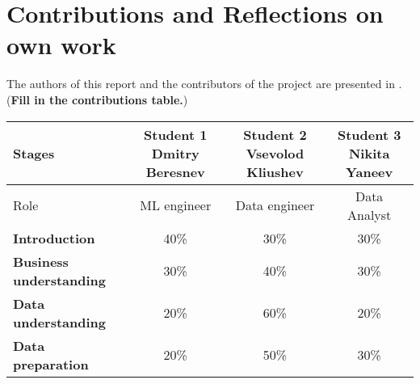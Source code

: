 \section{Contributions and Reflections on own work }\label{chap:contributionsAndReflectionOnOwnWork}

The authors of this report and the contributors of the project are presented in . (\textbf{Fill in the contributions table.})


\begin{table}[h!]
  \footnotesize
  \centering
  \begin{tabular}{|l||c|c|c|}
    \toprule
    Stages                          & \begin{minipage}{0.2\textwidth} Student 1 Dmitry Beresnev \end{minipage} & \begin{minipage}{0.2\textwidth} Student 2 Vsevolod Kliushev\end{minipage} & \begin{minipage}{0.2\textwidth} Student 3 Nikita Yaneev \end{minipage} \\
    \midrule
    Role                            & ML engineer                                                              & Data engineer                                                             & Data Analyst                                                           \\
    \midrule
    \textbf{Introduction}           & 40\%                                                                     & 30\%                                                                      & 30\%                                                                   \\
    \textbf{Business understanding} & 30\%                                                                     & 40\%                                                                      & 30\%                                                                   \\
    \textbf{Data understanding}     & 20\%                                                                     & 60\%                                                                      & 20\%                                                                   \\
    \textbf{Data preparation}       & 20\%                                                                     & 50\%                                                                      & 30\%                                                                   \\

\end{tabular}
\end{table}
